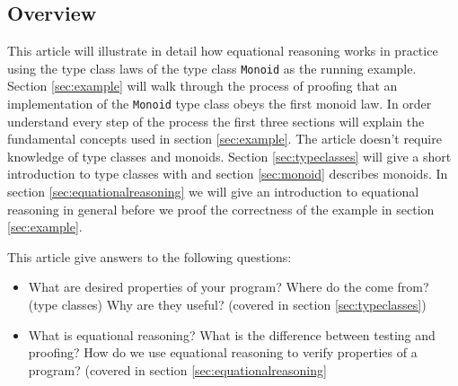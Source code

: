 \subsection{Overview}

This article will illustrate in detail how equational reasoning works in practice using the type class laws of the type class \verb|Monoid| as the running example. Section \ref{sec:example} will walk through the process of proofing that an implementation of the \verb|Monoid| type class obeys the first monoid law.  In order understand every step of the process the first three sections will explain the fundamental concepts used in section \ref{sec:example}. The article doesn't require knowledge of type classes and monoids. 
Section \ref{sec:typeclasses} will give a short introduction to type classes with and section \ref{sec:monoid} describes monoids. In section \ref{sec:equationalreasoning} we will give an introduction to equational reasoning in general before we proof the correctness of the example in section \ref{sec:example}.

This article give answers to the following questions:
\begin{itemize}
\item What are desired properties of your program? Where do the come from? (type classes) Why are they useful? (covered in section \ref{sec:typeclasses})
\item What is equational reasoning? What is the difference between testing and proofing? How do we use equational reasoning to verify properties of a program? (covered in section \ref{sec:equationalreasoning}
\end{itemize}

